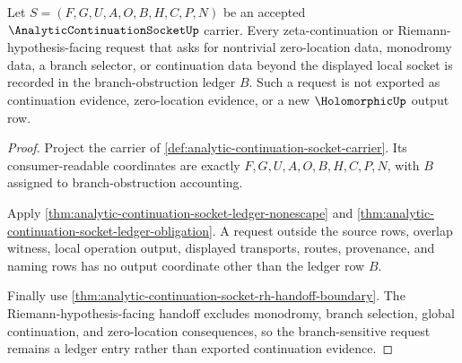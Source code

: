 \begin{theorem}
\label{thm:analytic-continuation-socket-zeta-branch-obstruction-exactness}
Let $S=(F,G,U,A,O,B,H,C,P,N)$ be an accepted $\AnalyticContinuationSocketUp$ carrier. Every zeta-continuation or Riemann-hypothesis-facing request that asks for nontrivial zero-location data, monodromy data, a branch selector, or continuation data beyond the displayed local socket is recorded in the branch-obstruction ledger $B$. Such a request is not exported as continuation evidence, zero-location evidence, or a new $\HolomorphicUp$ output row.
\end{theorem}
\begin{proof}
Project the carrier of \autoref{def:analytic-continuation-socket-carrier}. Its consumer-readable coordinates are exactly $F,G,U,A,O,B,H,C,P,N$, with $B$ assigned to branch-obstruction accounting.

Apply \autoref{thm:analytic-continuation-socket-ledger-nonescape} and \autoref{thm:analytic-continuation-socket-ledger-obligation}. A request outside the source rows, overlap witness, local operation output, displayed transports, routes, provenance, and naming rows has no output coordinate other than the ledger row $B$.

Finally use \autoref{thm:analytic-continuation-socket-rh-handoff-boundary}. The Riemann-hypothesis-facing handoff excludes monodromy, branch selection, global continuation, and zero-location consequences, so the branch-sensitive request remains a ledger entry rather than exported continuation evidence.
\end{proof}

